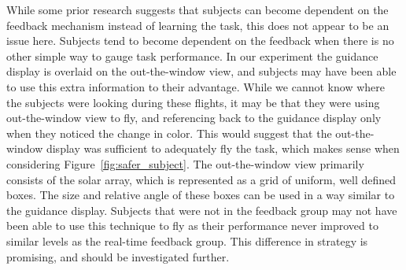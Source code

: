 \documentclass[]{aiaa-tc}%
\begin{document}
While some prior research suggests that subjects can become dependent on the feedback mechanism instead of learning the task, this does not appear to be an issue here. Subjects tend to become dependent on the feedback when there is no other simple way to gauge task performance. In our experiment the guidance display is overlaid on the out-the-window view, and subjects may have been able to use this extra information to their advantage. While we cannot know where the subjects were looking during these flights, it may be that they were using out-the-window view to fly, and referencing back to the guidance display only when they noticed the change in color. This would suggest that the out-the-window display was sufficient to adequately fly the task, which makes sense when considering Figure~\ref{fig:safer_subject}. The out-the-window view primarily consists of the solar array, which is represented as a grid of uniform, well defined boxes. The size and relative angle of these boxes can be used in a way similar to the guidance display. Subjects that were not in the feedback group may not have been able to use this technique to fly as their performance never improved to similar levels as the real-time feedback group. This difference in strategy is promising, and should be investigated further.


\end{document}
